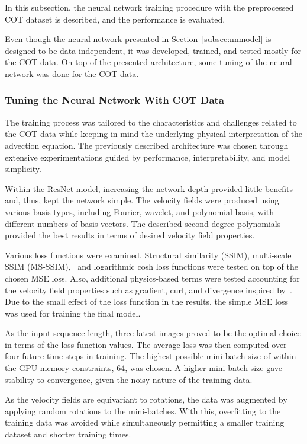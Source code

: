 In this subsection, the neural network training procedure with the preprocessed COT dataset is described, and the performance is evaluated.

Even though the neural network presented in Section~\ref{subsec:nnmodel} is designed to be data-independent, it was developed, trained, and tested mostly for the COT data.
On top of the presented architecture, some tuning of the neural network was done for the COT data.

\subsubsection{Tuning the Neural Network With COT Data}
The training process was tailored to the characteristics and challenges related to the COT data while keeping in mind the underlying physical interpretation of the advection equation.
The previously described architecture was chosen through extensive experimentations guided by performance, interpretability, and model simplicity.

Within the ResNet model, increasing the network depth provided little benefits and, thus, kept the network simple.
The velocity fields were produced using various basis types, including Fourier, wavelet, and polynomial basis, with different numbers of basis vectors.
The described second-degree polynomials provided the best results in terms of desired velocity field properties.

Various loss functions were examined.
Structural similarity (SSIM), multi-scale SSIM (MS-SSIM),~\cite{ssim} and logarithmic cosh loss functions were tested on top of the chosen MSE loss.
Also, additional physics-based terms were tested accounting for the velocity field properties such as gradient, curl, and divergence inspired by~\cite{debezenac}.
Due to the small effect of the loss function in the results, the simple MSE loss was used for training the final model.

As the input sequence length, three latest images proved to be the optimal choice in terms of the loss function values.
The average loss was then computed over four future time steps in training.
The highest possible mini-batch size of within the GPU memory constraints, 64, was chosen.
A higher mini-batch size gave stability to convergence, given the noisy nature of the training data.

As the velocity fields are equivariant to rotations, the data was augmented by applying random rotations to the mini-batches.
With this, overfitting to the training data was avoided while simultaneously permitting a smaller training dataset and shorter training times.


